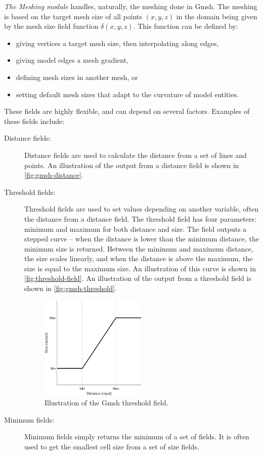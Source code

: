 \emph{The Meshing module} handles, naturally, the meshing done in Gmsh. The meshing is based on the target mesh size of all points $(x, y, z)$ in the domain being given by the mesh size field function $\delta(x, y, z)$. This function can be defined by:
\begin{itemize}
    \item giving vertices a target mesh size, then interpolating along edges,
    \item giving model edges a mesh gradient,
    \item defining mesh sizes in another mesh, or
    \item setting default mesh sizes that adapt to the curvature of model entities.
\end{itemize}
These fields are highly flexible, and can depend on several factors. Examples of these fields include:
\begin{description}
    \item[Distance fields:] Distance fields are used to calculate the distance from a set of lines and points. An illustration of the output from a distance field is shown in \autoref{fig:gmsh-distance}.
    \item[Threshold fields:] Threshold fields are used to set values depending on another variable, often the distance from a distance field. The threshold field has four parameters: minimum and maximum for both distance and size. The field outputs a stepped curve -- when the distance is lower than the minimum distance, the minimum size is returned. Between the minimum and maximum distance, the size scales linearly, and when the distance is above the maximum, the size is equal to the maximum size. An illustration of this curve is shown in \autoref{fig:threshold-field}. An illustration of the output from a threshold field is shown in \autoref{fig:gmsh-threshold}.
    
    \begin{figure}[ht]
        \centering
        \includegraphics[width=0.5\textwidth]{report/Images/Software/thresholdCurve.png}
        \caption{Illustration of the Gmsh threshold field.}
        \label{fig:threshold-field}
    \end{figure}
    
    \item[Minimum fields:] Minimum fields simply returns the minimum of a set of fields. It is often used to get the smallest cell size from a set of size fields.
\end{description}

